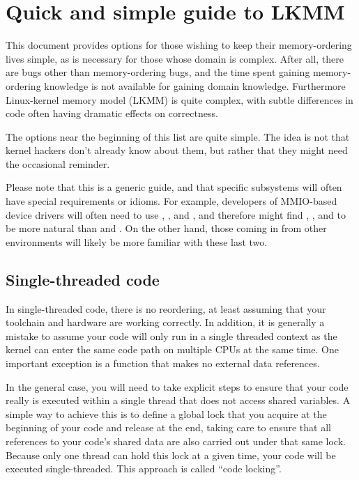 \section{Quick and simple guide to LKMM}

This document provides options for those wishing to keep their
memory-ordering lives simple, as is necessary for those whose domain
is complex.
After all, there are bugs other than memory-ordering bugs,
and the time spent gaining memory-ordering knowledge is not available
for gaining domain knowledge.
Furthermore Linux-kernel memory model (LKMM) is quite complex, with
subtle differences in code often having dramatic effects on correctness.

The options near the beginning of this list are quite simple.
The idea is not that kernel hackers don't already know about them,
but rather that they might need the occasional reminder.

Please note that this is a generic guide, and that specific subsystems
will often have special requirements or idioms.
For example, developers of MMIO-based device drivers will often need
to use , , and , and therefore might find
, , and 
to be more natural than  and .
On the other hand, those coming in from other environments will likely
be more familiar with these last two.


\subsection{Single-threaded code}

In single-threaded code, there is no reordering, at least assuming
that your toolchain and hardware are working correctly.
In addition, it is generally a mistake to assume your code will only
run in a single threaded context as the kernel can enter the same code
path on multiple CPUs at the same time.
One important exception is a function that makes no external data references.

In the general case, you will need to take explicit steps to ensure that
your code really is executed within a single thread that does not access
shared variables.
A simple way to achieve this is to define a global lock that you acquire
at the beginning of your code and release at the end, taking care to
ensure that all references to your code's shared data are also carried
out under that same lock.
Because only one thread can hold this lock at a given time, your code
will be executed single-threaded.
This approach is called ``code locking''.

